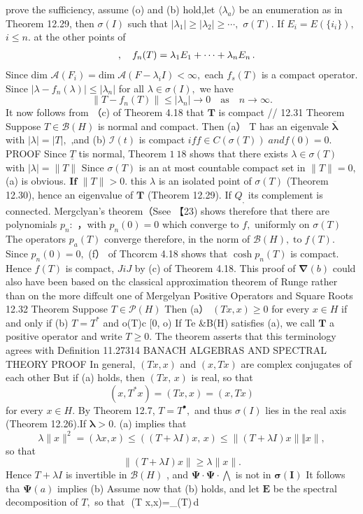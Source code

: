 prove the sufficiency, assume (o) and (b) hold,let $\scriptstyle \langle{\lambda_{a}} \rangle$ be an enumeration as in Theorem 12.29, then $\sigma(I)$ such that $\vert\lambda_{1}\vert\geq\vert\lambda_{2}\vert\geq\cdots,$ $\sigma(T).$ If $E_{i}=E(\{i_{i}\}),$ $i\leq n.$ at the other points of $$ \begin{array}{r l}{\quad,{\quad}f_{n}(T)=\lambda_{1}E_{1}+\cdots+\lambda_{n}E_{n}\,.}\end{array} $$ Since dim $\mathcal{A}(F_{i})=\mathrm{dim}\;\mathcal{A}(F-\lambda_{i}I)<\infty,$ each $f_{s}(T)$ is a compact operator. Since $|\lambda-f_{n}(\lambda)|\leq|\lambda_{n}|$ for all $\lambda\in\sigma(I),$ we have $$ \|T-f_{n}(T)\|\leq\left|\lambda_{n}\right|\to0\quad\mathrm{as}\quad n\to\infty. $$ It now follows from （c) of Theorem 4.18 that ${\boldsymbol{T}}$ is compact // 12.31 Theorem Suppose $T\in{\mathcal{B}}(H)$ is normal and compact. Then (a） T has an eigenvale ${\boldsymbol{\bar{\lambda}}}$ with $|\lambda|=|T|,$ ,and (b) ${\mathcal{I}}(t)$ is compact $i f f\in C(\sigma(T))\;a n d f(0)=0.$ PROOF Since $\underline{{T}}$ tis normal, Theorem $\scriptstyle1{\mathrm{~}}18$ shows that there exists $\lambda\in\sigma(T)$ with $|\lambda|=\|T\|$ Since $\sigma(T)$ is an at most countable compact set in $\|T\|=0,$ (a) is obvious. $\mathbf{I}\mathbf{f}$ $\|T\|>0.$ this $\lambda$ is an isolated point of $\sigma(T)$ (Theorem 12.30), hence an eigenvalue of ${\boldsymbol{T}}$ (Theorem 12.29). If $Q_{\mathrm{{,}}}$ its complement is connected. Mergclyan's theorem（Ssee 【23) shows therefore that there are polynomials $p_{n}:$ ，with $p_{n}(0)=0$ which converge to $f,$ uniformly on $\sigma(T)$ The operators $p_{a}(T)$ converge therefore, in the norm of ${\mathcal{B}}(H),\operatorname{to}f(T).$ Since $p_{n}(0)=0,$ (f） of Thcorcm 4.18 shows that $\cosh p_{n}(T)$ is compact. Hence $\textstyle f(T)$ is compact, $J i J$ by (c) of Theorem 4.18. This proof of $\mathbf{\nabla}(b)$ could also have been based on thc classical approximation theorem of Runge rather than on the more diffcult one of Mergelyan Positive Operators and Square Roots 12.32 Theorem Suppose $T\in{\mathcal{P}}(H)$ Then (a） $(T x,x)\geq0$ for every $x\in H$ if and only if (b) $T=T^{*}$ and o(T)c [0, o) If Te &B(H) satisfies (a), we call ${\boldsymbol{T}}$ a positive operator and write $T\geq0.$ The theorem asserts that this terminology agrees with Definition 11.27314 BANACH ALGEBRAS AND SPECTRAL THEORY PROOF In general, $(T x,x)$ and $(x,T x)$ are complex conjugates of each other But if (a) holds, then $(T x,\,x)$ is real, so that $$ (x,T^{*}x)=(T x,x)=(x,T x) $$ for every $x\in H.$ By Theorem 12.7, $T=T^{\bullet},$ and thus $\sigma(I)$ lies in the real axis (Theorem 12.26).If ${\boldsymbol{\lambda}}>0.$ (a) implies that $$ \lambda\|x\|^{2}=(\lambda x,x)\leq((T+\lambda I)x,\,x)\leq\|(T+\lambda I)x\|\Vert x\|, $$ so that $$ \|(T+\lambda I)x\|\geq\lambda\|x\|. $$ Hence $T+\lambda I$ is invertible in ${\mathcal{B}}(H)$ , and $\mathbf{\Psi}\cdot\mathbf{\Psi}\cdot\bigwedge$ is not in ${\boldsymbol{\sigma}}({\boldsymbol{I}})$ It follows tha $\mathbf{\Psi}(a)$ implies (b) Assume now that (b) holds, and let $\boldsymbol{E}$ be the spectral decomposition of $T,$ so that $$ (T x,x)=\int_{\sigma(T)}\lambda\,d 